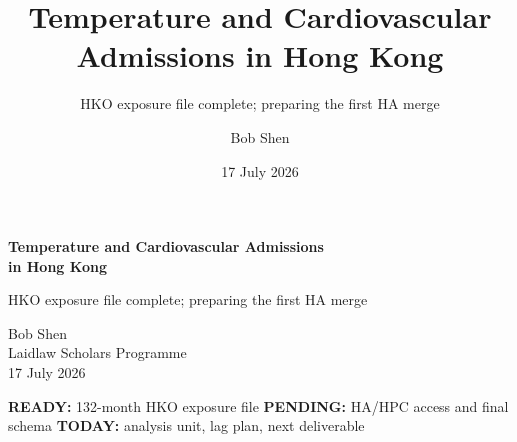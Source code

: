 \documentclass[aspectratio=169,10pt]{beamer}
\title{Temperature and Cardiovascular Admissions in Hong Kong}
\subtitle{HKO exposure file complete; preparing the first HA merge}
\author{Bob Shen}
\date{17 July 2026}
\institute{Laidlaw Scholars Programme}
\begin{document}
\begin{frame}[plain]
  \vspace{0.65cm}
  {\color{LaidlawNavy}\LARGE\bfseries Temperature and Cardiovascular Admissions\\[0.15em]
  in Hong Kong\par}
  \vspace{0.45em}
  {\color{LaidlawTeal}\large HKO exposure file complete; preparing the first HA merge\par}

  \vspace{0.9em}
  {\normalsize Bob Shen\\[0.15em]
  Laidlaw Scholars Programme\\[0.15em]
  17 July 2026\par}

  \vspace{1.35em}
  \begin{center}
  \scriptsize
  {\color{LaidlawTeal}\textbf{\footnotesize READY:}} 132-month HKO exposure file
  \hspace{0.9em}
  {\color{LaidlawRust}\textbf{\footnotesize PENDING:}} HA/HPC access and final schema
  \hspace{0.9em}
  {\color{LaidlawNavy}\textbf{\footnotesize TODAY:}} analysis unit, lag plan, next deliverable
  \end{center}
\end{frame}
\end{document}
